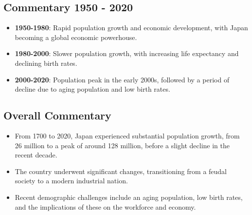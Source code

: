 \subsection*{Commentary 1950 - 2020}
\begin{itemize}
    \item \textbf{1950-1980}: Rapid population growth and economic development, with Japan becoming a global economic powerhouse.
    \item \textbf{1980-2000}: Slower population growth, with increasing life expectancy and declining birth rates.
    \item \textbf{2000-2020}: Population peak in the early 2000s, followed by a period of decline due to aging population and low birth rates.
\end{itemize}

\subsection*{Overall Commentary}
\begin{itemize}
    \item From 1700 to 2020, Japan experienced substantial population growth, from 26 million to a peak of around 128 million, before a slight decline in the recent decade.
    \item The country underwent significant changes, transitioning from a feudal society to a modern industrial nation.
    \item Recent demographic challenges include an aging population, low birth rates, and the implications of these on the workforce and economy.
\end{itemize}

